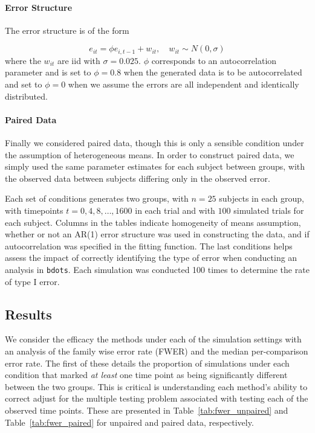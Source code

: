 \documentclass{article}
\newcommand{\xt}{\texttt}
\begin{document}
\paragraph{Error Structure} The error structure is of the form

\begin{equation}
e_{it} = \phi e_{i, t-1} + w_{it}, \quad w_{it} \sim N(0, \sigma)
\end{equation}
where the $w_{it}$ are iid with $\sigma = 0.025$. $\phi$ corresponds to an autocorrelation parameter and is set to $\phi = 0.8$ when the generated data is to be autocorrelated and set to $\phi = 0$ when we assume the errors are all independent and identically distributed. 

\paragraph{Paired Data} Finally we considered paired data, though this is only a sensible condition under the assumption of heterogeneous means. In order to construct paired data, we simply used the same parameter estimates for each subject between groups, with the observed data between subjects differing only in the observed error.


Each set of conditions generates two groups, with $n = 25$ subjects in each group, with timepoints $t = 0, 4, 8, \dots, 1600$ in each trial and with $100$ simulated trials for each subject. Columns in the tables indicate homogeneity of means assumption, whether or not an AR(1) error structure was used in constructing the data, and if autocorrelation was specified in the fitting function. The last conditions helps assess the impact of correctly identifying the type of error when conducting an analysis in \xt{bdots}. Each simulation was conducted 100 times to determine the rate of type I error. 


\subsection{Results}

We consider the efficacy the methods under each of the simulation settings with an analysis of the family wise error rate (FWER) and the median per-comparison error rate. The first of these details the proportion of simulations under each condition that marked \textit{at least} one time point as being significantly different between the two groups. This is critical is understanding each method's ability to correct adjust for the multiple testing problem associated with testing each of the observed time points. These are presented in Table~\ref{tab:fwer_unpaired} and Table~\ref{tab:fwer_paired} for unpaired and paired data, respectively.
\end{document}

